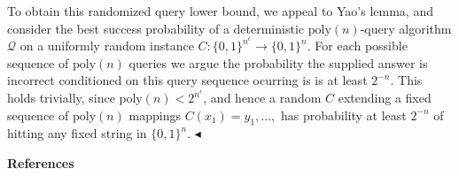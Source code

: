 \documentclass[10pt,a4paper]{article}
\begin{document}
To obtain this randomized query lower bound, we appeal to Yao’s lemma, and consider the best success probability of a deterministic $\mathrm{poly}(n)$-query algorithm $\mathcal{Q}$ on a uniformly random instance $C:\{0,1\}^{n^{\epsilon}}\to\{0,1\}^{n}$. For each possible sequence of $\mathrm{poly}(n)$ queries we argue the probability the supplied answer is incorrect conditioned on this query sequence ocurring is is at least $2^{-n}$. This holds trivially, since $\mathrm{poly}(n)<2^{n^{\epsilon}}$, and hence a random $C$ extending a fixed sequence of $\mathrm{poly}(n)$ mappings $C(x_{1})=y_{1},\ldots,$ has probability at least $2^{-n}$ of hitting any fixed string in $\{0,1\}^{n}$.
$\blacktriangleleft$\par







\par\medskip\noindent\textbf{References}\par
\end{document}
